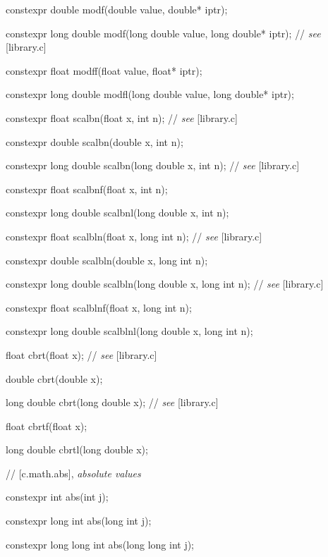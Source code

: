 \documentclass[prd,twocolumn,amsmath,amssymb,nofootinbib,eqsecnum]{revtex4-1}
\newcommand{\highlight}[1]{{\color{green} #1}}
\newcommand{\stdcomment}[1]{{// {\it see} [#1]}}
\begin{document}
{\highlight{constexpr}  double modf(double value, double* iptr);

\highlight{constexpr}  long double modf(long double value, long double* iptr); \stdcomment{library.c}

\highlight{constexpr}  float modff(float value, float* iptr);

\highlight{constexpr}  long double modfl(long double value, long double* iptr);

\vspace{2ex}

\highlight{constexpr} float scalbn(float x, int n); \stdcomment{library.c}

\highlight{constexpr} double scalbn(double x, int n);

\highlight{constexpr} long double scalbn(long double x, int n); \stdcomment{library.c}

\highlight{constexpr} float scalbnf(float x, int n);

\highlight{constexpr} long double scalbnl(long double x, int n);

\vspace{2ex}

\highlight{constexpr} float scalbln(float x, long int n); \stdcomment{library.c}

\highlight{constexpr} double scalbln(double x, long int n);

\highlight{constexpr} long double scalbln(long double x, long int n); \stdcomment{library.c}

\highlight{constexpr} float scalblnf(float x, long int n);

\highlight{constexpr} long double scalblnl(long double x, long int n);

\vspace{2ex}

float cbrt(float x); \stdcomment{library.c}

double cbrt(double x);

long double cbrt(long double x); \stdcomment{library.c}

float cbrtf(float x);

long double cbrtl(long double x);

\vspace{2ex}

//  [c.math.abs], {\it absolute values}

\highlight{constexpr} int abs(int j);

\highlight{constexpr} long int abs(long int j);

\highlight{constexpr} long long int abs(long long int j);

}
\end{document}
